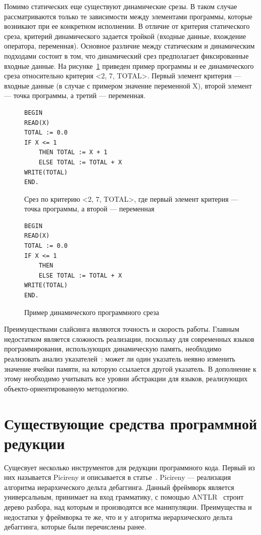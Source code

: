 Помимо статических еще существуют динамические срезы. В таком случае рассматриваются только те зависимости между элементами программы, которые возникают при ее конкретном исполнении. В отличие от критерия статического среза, критерий динамического задается тройкой (входные данные, вхождение оператора, переменная). Основное различие между статическим и динамическим подходами состоит в том, что динамический срез предполагает фиксированные входные данные. На рисунке~\ref{ex:dynslice} приведен пример программы и ее динамического среза относительно критерия <2, 7, {TOTAL}>. Первый элемент критерия --- входные данные (в случае с примером значение переменной X), второй элемент --- точка программы, а третий --- переменная.
\begin{figure}[]
\begin{lstlisting}
BEGIN
READ(X)
TOTAL := 0.0
IF X <= 1
	THEN TOTAL := X + 1
	ELSE TOTAL := TOTAL + X
WRITE(TOTAL)
END.
\end{lstlisting}
Срез по критерию <2, 7, {TOTAL}>, где первый элемент критерия --- точка программы, а второй --- переменная
\begin{lstlisting}
BEGIN
READ(X)
TOTAL := 0.0
IF X <= 1
	THEN
	ELSE TOTAL := TOTAL + X
WRITE(TOTAL)
END.
\end{lstlisting}
\caption{Пример динамического программного среза}
\label{ex:dynslice}
\end{figure}

Преимуществами слайсинга являются точность и скорость работы. Главным недостатком является сложность реализации, поскольку для современных языков программирования, использующих динамическую память, необходимо реализовать анализ указателей~\cite{deutsch1994interprocedural}: может ли один указатель неявно изменить значение ячейки памяти, на которую ссылается другой указатель. В дополнение к этому необходимо учитывать все уровни абстракции для языков, реализующих объекто-ориентированную методологию.

\section{Существующие средства программной редукции}
Сущесвует несколько инструментов для редукции программного кода. Первый из них называется Picireny и описывается в статье~\cite{hodovan2017tree}. Picireny --- реализация алгоритма иерархического дельта дебаггинга. Данный фреймворк является универсальным, принимает на вход грамматику, с помощью ANTLR~\cite{parr2013definitive} строит дерево разбора, над которым и производятся все манипуляции. Преимущества и недостатки у фреймворка те же, что и у алгоритма иерархического дельта дебаггинга, которые были перечислены ранее. 

